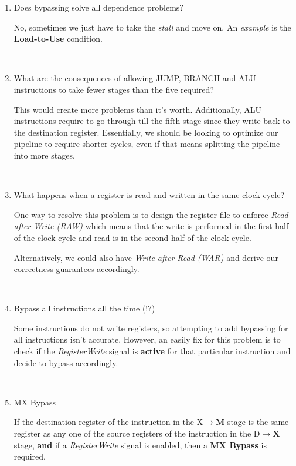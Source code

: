 \documentclass[12pt]{article}
\newenvironment{QandA}{\begin{enumerate}[label=\bfseries\arabic*.]\bfseries}
                      {\end{enumerate}}
\newenvironment{answered}{\par\quad\normalfont}{}
\begin{document}
\begin{QandA}
   \ 
   
   \item Does bypassing solve all dependence problems?
   \begin{answered}
   No, sometimes we just have to take the \textit{stall} and move on. An \textit{example} is the \textbf{Load-to-Use} condition. 
   \end{answered}
   
   \ 
   
   \item What are the consequences of allowing JUMP, BRANCH and ALU instructions to take fewer stages than the five required?
   \begin{answered}
   This would create more problems than it's worth. Additionally, ALU instructions require to go through till the fifth stage since they write back to the destination register. Essentially, we should be looking to optimize our pipeline to require shorter cycles, even if that means splitting the pipeline into more stages.
   \end{answered}
   
   \ 
   
   \item What happens when a register is read and written in the same clock cycle?
   \begin{answered}
   One way to resolve this problem is to design the register file to enforce \textit{Read-after-Write (RAW)} which means that the write is performed in the first half of the clock cycle and read is in the second half of the clock cycle. 
   
   Alternatively, we could also have \textit{Write-after-Read (WAR)} and derive our correctness guarantees accordingly. 
   \end{answered}
   
   \
   
   \item Bypass all instructions all the time (!?)
   \begin{answered}
   Some instructions do not write registers, so attempting to add bypassing for all instructions isn't accurate. However, an easily fix for this problem is to check if the \textit{RegisterWrite} signal is \textbf{active} for that particular instruction and decide to bypass accordingly. 
   \end{answered}
   
   \
   
   \item MX Bypass
   \begin{answered}
   If the destination register of the instruction in the X$\rightarrow$\textbf{M} stage is the same register as any one of the source registers of the instruction in the D$\rightarrow$\textbf{X} stage, \textbf{and} if a \textit{RegisterWrite} signal is enabled, then a \textbf{MX Bypass} is required.  
   

\end{answered}
\end{QandA}
\end{document}
